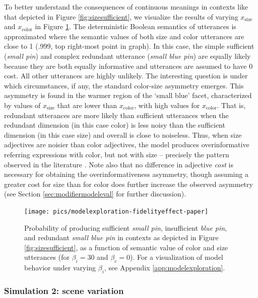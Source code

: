 \documentclass[11pt]{article}
\newcommand{\figref}[1]{Figure \ref{#1}}
\newcommand{\appref}[1]{Appendix \ref{#1}}
\newcommand{\sectionref}[1]{Section \ref{#1}}
\begin{document}
To better understand the consequences of continuous meanings in contexts like that depicted in \figref{fig:sizesufficient}, we visualize the results of varying  $x_{\text{size}}$ and $x_{\text{color}}$ in \figref{fig:basicasymmetry}. 
The deterministic Boolean semantics of utterances is approximated where the  semantic values of both size and color utterances are close to 1 (.999, top right-most point in graph).  In this case, the simple sufficient (\emph{small pin}) and complex redundant utterance (\emph{small blue pin}) are equally likely because they are both equally informative and utterances are assumed to have 0 cost. All other utterances are highly unlikely. The interesting question is under which circumstances, if any,  the standard color-size asymmetry emerges. This asymmetry is found in the warmer region of the `small blue' facet, characterized by values of $x_{\text{size}}$ that are lower than $x_{\text{color}}$, with high values for $x_{\text{color}}$. That is, redundant utterances are more likely than sufficient utterances when the redundant dimension (in this case color) is less noisy than the sufficient dimension (in this case size) and overall is close to noiseless. 
Thus, when size adjectives are noisier than color adjectives, the model produces overinformative referring expressions with color, but not with size -- precisely the pattern observed in the literature \cite{Pechmann1989, gatt2011}. Note also that no difference in adjective \emph{cost} is necessary for obtaining the overinformativeness asymmetry, though assuming a greater cost for size than for color does further increase the observed asymmetry (see \sectionref{sec:modifiermodeleval} for further discussion).

\begin{figure}
\centering
\texttt{[image: pics/modelexploration-fidelityeffect-paper]}

\caption{Probability of producing sufficient \emph{small pin}, insufficient \emph{blue pin}, and redundant \emph{small blue pin} in contexts as depicted in \figref{fig:sizesufficient}, as a function of semantic value of color and size utterances (for $\beta_i = 30$ and $ \beta_c = 0$). For a visualization of model behavior under varying $\beta_i$, see \appref{app:modelexploration}.}
\label{fig:basicasymmetry}
\end{figure}

\subsubsection{Simulation 2: scene variation}
\label{sec:modelkoolen}
\end{document}
